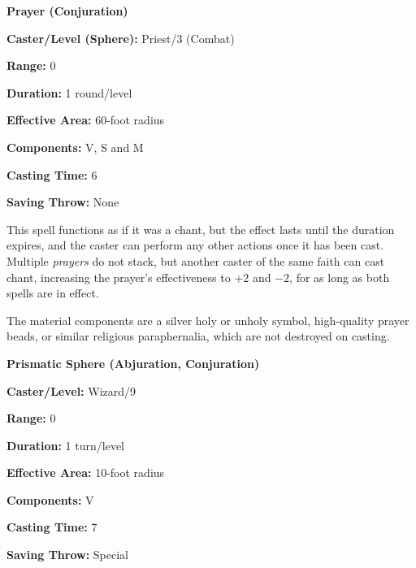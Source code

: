 \begin{multicols}{2}
\vspace{1em}

\noindent
\begin{minipage}{\columnwidth}

\noindent \textbf{Prayer (Conjuration)}

\noindent \textbf{Caster/Level (Sphere):} Priest/3 (Combat)

\noindent \textbf{Range:} 0

\noindent \textbf{Duration:} 1 round/level

\noindent \textbf{Effective Area:} 60-foot radius

\noindent \textbf{Components:} V, S and M

\noindent \textbf{Casting Time:} 6

\noindent \textbf{Saving Throw:} None

\end{minipage}

This spell functions as if it was a chant, but the effect lasts until the duration expires, and the caster can perform any other actions once it has been cast.  Multiple \textit{prayers} do not stack, but another caster of the same faith can cast chant, increasing the prayer's effectiveness to +2 and $-2$, for as long as both spells are in effect.  

The material components are a silver holy or unholy symbol, high-quality prayer beads, or similar religious paraphernalia, which are not destroyed on casting.

\vspace{1em}

\noindent
\begin{minipage}{\columnwidth}

\noindent \textbf{Prismatic Sphere (Abjuration, Conjuration)}

\noindent \textbf{Caster/Level:} Wizard/9

\noindent \textbf{Range:} 0

\noindent \textbf{Duration:} 1 turn/level

\noindent \textbf{Effective Area:} 10-foot radius

\noindent \textbf{Components:} V

\noindent \textbf{Casting Time:} 7

\noindent \textbf{Saving Throw:} Special

\end{minipage}


\end{multicols}
